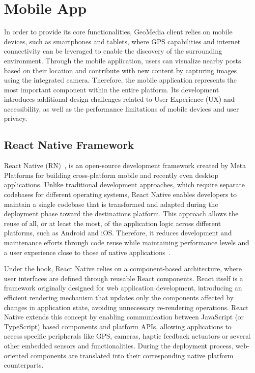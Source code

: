 \chapter{Mobile App}
\label{cap:mobile}

In order to provide its core functionalities, GeoMedia client relies on mobile devices, such as smartphones and tablets, where GPS capabilities and internet connectivity can be leveraged to enable the discovery of the surrounding environment. Through the mobile application, users can visualize nearby posts based on their location and contribute with new content by capturing images using the integrated camera.
Therefore, the mobile application represents the most important component within the entire platform. Its development introduces additional design challenges related to User Experience (UX) and accessibility, as well as the performance limitations of mobile devices and user privacy.


\section{React Native Framework}


React Native (RN)~\cite{site:react-native}, is an open-source development framework created by Meta Platforms for building cross-platform mobile and recently even desktop applications. Unlike traditional development approaches, which require separate codebases for different operating systems, React Native enables developers to maintain a single codebase that is transformed and adapted during the deployment phase toward the destinations platform. This approach allows the reuse of all, or at least the most, of the application logic across different platforms, such as Android and iOS. Therefore, it reduces development and maintenance efforts through code reuse while maintaining performance levels and a user experience close to those of native applications~\cite{site:reactnative-performance}.

Under the hook, React Native relies on a component-based architecture, where user interfaces are defined through reusable React components. React itself is a framework originally designed for web application development, introducing an efficient rendering mechanism that updates only the components affected by changes in application state, avoiding unnecessary re-rendering operations. React Native extends this concept by enabling communication between JavaScript (or TypeScript) based components and platform APIs, allowing applications to access specific peripherals like GPS, cameras, haptic feedback actuators or several other embedded sensors and functionalities.
During the deployment process, web-oriented components are translated into their corresponding native platform counterparts.

